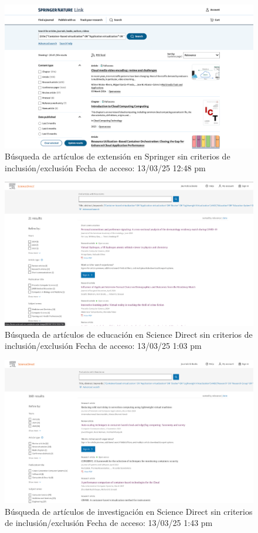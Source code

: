 \FloatBarrier\begin{figure}[H]
	\centering
	\includegraphics[width=\textwidth,keepaspectratio]{apendices/BD/sin-criterios/Springer-ind.png}
	\caption{Búsqueda de artículos de extensión en Springer sin criterios de inclusión/exclusión
		Fecha de acceso: 13/03/25 12:48 pm}\label{fig:busqueda9}
\end{figure}
\FloatBarrier\begin{figure}[H]
	\centering
	\includegraphics[width=\textwidth,keepaspectratio]{apendices/BD/sin-criterios/SD-ed.png}
	\caption{Búsqueda de artículos de educación en Science Direct sin criterios de inclusión/exclusión
		Fecha de acceso: 13/03/25 1:03 pm}\label{fig:busqueda10}
\end{figure}
\FloatBarrier\begin{figure}[H]
	\centering
	\includegraphics[width=\textwidth,keepaspectratio]{apendices/BD/sin-criterios/SD-inv.png}
	\caption{Búsqueda de artículos de investigación en Science Direct sin criterios de inclusión/exclusión
		Fecha de acceso: 13/03/25 1:43 pm}\label{fig:busqueda11}
\end{figure}
